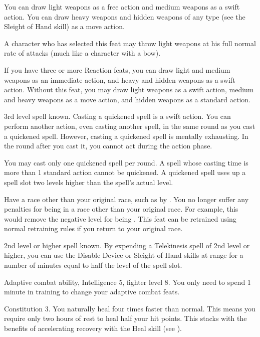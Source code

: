 \featben You can draw light weapons as a free action and medium weapons as a swift action.
You can draw heavy weapons and hidden weapons of any type (see the Sleight of Hand skill) as a move action.
\par A character who has selected this feat may throw light weapons at his full normal rate of attacks (much like a character with a bow).

If you have three or more Reaction feats, you can draw light and medium weapons as an immediate action, and heavy and hidden weapons as a swift action.
Without this feat, you may draw light weapons as a swift action, medium and heavy weapons as a move action, and hidden weapons as a standard action.

\label{Quicken Spell}
\featpre 3rd level spell known.
\featben Casting a quickened spell is a swift action.
You can perform another action, even casting another spell, in the same round as you cast a quickened spell.
However, casting a quickened spell is mentally exhausting.
In the round after you cast it, you cannot act during the action phase.

You may cast only one quickened spell per round.
A spell whose casting time is more than 1 standard action cannot be quickened.
A quickened spell uses up a spell slot two levels higher than the spell's actual level.

\label{Racial Acclimation}
\featpre Have a race other than your original race, such as by .
\featben You no longer suffer any penalties for being in a race other than your original race.
For example, this would remove the negative level for being .
This feat can be retrained using normal retraining rules if you return to your original race.

\featpre 2nd level or higher  spell known.
\featben By expending a Telekinesis spell of 2nd level or higher, you can use the Disable Device or Sleight of Hand skills at \rngclose range for a number of minutes equal to half the level of the spell slot.

\featpre Adaptive combat ability, Intelligence 5, fighter level 8.
\featben You only need to spend 1 minute in training to change your adaptive combat feats.

\featpre Constitution 3.
\featben You naturally heal four times faster than normal.
This means you require only two hours of rest to heal half your hit points.
This stacks with the benefits of accelerating recovery with the Heal skill (see ).

